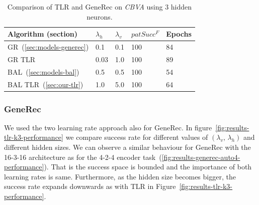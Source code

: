 \begin{table}[H] 
  \centering
    \begin{tabular}{|l|l|l|l|l|}
    \hline
    Algorithm (section)&$\lambda_h$&$\lambda_v$&$patSucc^F$ &Epochs\\ %
    \hline
    GR~(\ref{sec:models-generec}) & 0.1 & 0.1 & 100 & 84\\ %
    \hline
    GR TLR &0.03 & 1.0 & 100 & 89\\ %
    \hline
    BAL~(\ref{sec:models-bal})&0.5& 0.5&100& 54\\ %
    \hline
    BAL TLR~(\ref{sec:our-tlr})&1.0& 5.0 & 100& 64\\ %
    \hline 
    \end{tabular}
  \caption{Comparison of TLR and GeneRec on \emph{CBVA} using 3 hidden neurons.} 
  \label{tab:results-cmp-k3}
\end{table}






\subsubsection{GeneRec} 

We used the two learning rate approach also for GeneRec. In figure~\ref{fig:results-tlr-k3-performance} we compare success rate for different values of $(\lambda_v,\, \lambda_h)$ and different hidden sizes. We can observe a similar behaviour for GeneRec with the 16-3-16 architecture as for the 4-2-4 encoder task~(\ref{fig:results-generec-auto4-performance}). That is the success space is bounded and the importance of both learning rates is same. Furthermore, as the hidden size becomes bigger, the success rate expands downwards as with TLR in Figure~\ref{fig:results-tlr-k3-performance}. 

